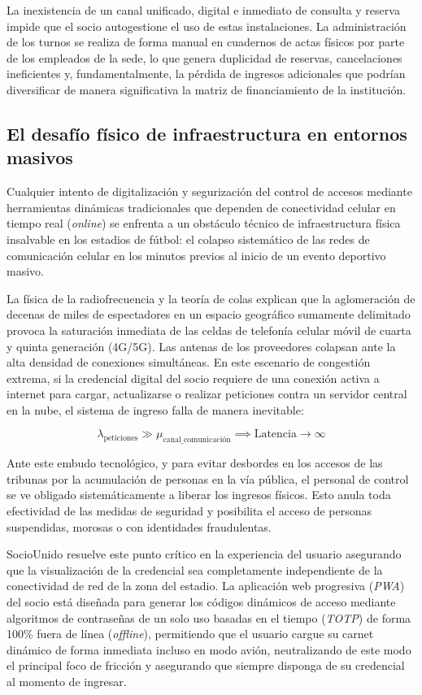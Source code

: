 La inexistencia de un canal unificado, digital e inmediato de consulta y reserva impide que el socio autogestione el uso de estas instalaciones. La administración de los turnos se realiza de forma manual en cuadernos de actas físicos por parte de los empleados de la sede, lo que genera duplicidad de reservas, cancelaciones ineficientes y, fundamentalmente, la pérdida de ingresos adicionales que podrían diversificar de manera significativa la matriz de financiamiento de la institución.

\subsection{El desafío físico de infraestructura en entornos masivos}

Cualquier intento de digitalización y segurización del control de accesos mediante herramientas dinámicas tradicionales que dependen de conectividad celular en tiempo real (\textit{online}) se enfrenta a un obstáculo técnico de infraestructura física insalvable en los estadios de fútbol: el colapso sistemático de las redes de comunicación celular en los minutos previos al inicio de un evento deportivo masivo.

La física de la radiofrecuencia y la teoría de colas explican que la aglomeración de decenas de miles de espectadores en un espacio geográfico sumamente delimitado provoca la saturación inmediata de las celdas de telefonía celular móvil de cuarta y quinta generación (4G/5G). Las antenas de los proveedores colapsan ante la alta densidad de conexiones simultáneas. En este escenario de congestión extrema, si la credencial digital del socio requiere de una conexión activa a internet para cargar, actualizarse o realizar peticiones contra un servidor central en la nube, el sistema de ingreso falla de manera inevitable:

\begin{equation}
    \lambda_{\text{peticiones}} \gg \mu_{\text{canal\_comunicación}} \implies \text{Latencia} \to \infty
\end{equation}

Ante este embudo tecnológico, y para evitar desbordes en los accesos de las tribunas por la acumulación de personas en la vía pública, el personal de control se ve obligado sistemáticamente a liberar los ingresos físicos. Esto anula toda efectividad de las medidas de seguridad y posibilita el acceso de personas suspendidas, morosas o con identidades fraudulentas.

SocioUnido resuelve este punto crítico en la experiencia del usuario asegurando que la visualización de la credencial sea completamente independiente de la conectividad de red de la zona del estadio. La aplicación web progresiva (\textit{PWA}) del socio está diseñada para generar los códigos dinámicos de acceso mediante algoritmos de contraseñas de un solo uso basadas en el tiempo (\textit{TOTP}) de forma 100\% fuera de línea (\textit{offline}), permitiendo que el usuario cargue su carnet dinámico de forma inmediata incluso en modo avión, neutralizando de este modo el principal foco de fricción y asegurando que siempre disponga de su credencial al momento de ingresar.


